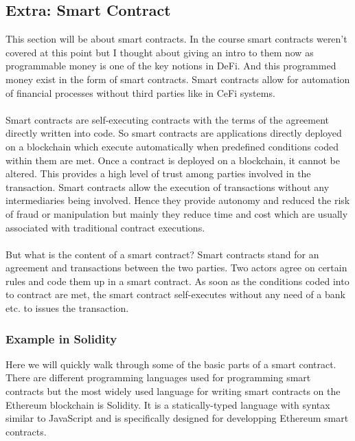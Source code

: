 \documentclass{article}
\begin{document}
\subsection{Extra: Smart Contract} 
This section will be about smart contracts. In the course smart contracts weren't covered at this point but I thought about giving an intro to them now as  programmable money is one of the key notions in DeFi. And this programmed money exist in the form of smart contracts. Smart contracts allow for automation of financial processes without third parties like in CeFi systems.\\ \\Smart contracts are self-executing contracts with the terms of the agreement directly written into code. So smart contracts are applications directly deployed on a blockchain which execute automatically when predefined conditions coded within them are met.  Once a contract is deployed on a blockchain, it cannot be altered. This provides a high level of trust among parties involved in the transaction. Smart contracts allow the execution of transactions without any intermediaries being involved. Hence they provide autonomy and reduced the risk of fraud or manipulation but mainly they reduce time and cost which are usually associated with traditional contract executions.\\ \\But what is the content of a smart contract? Smart contracts stand for an agreement and transactions between the two parties. Two actors agree on certain rules and code them up in a smart contract. As soon as the conditions coded into to contract are met, the smart contract self-executes without any need of a bank etc. to issues the transaction.

\subsubsection{Example in Solidity}
Here we will quickly walk through some of the basic parts of a smart contract. There are different programming languages used for programming smart contracts but the most widely used language for writing smart contracts on the Ethereum blockchain is Solidity. It is a statically-typed language with syntax similar to JavaScript and is specifically designed for developping Ethereum smart contracts.
\end{document}
